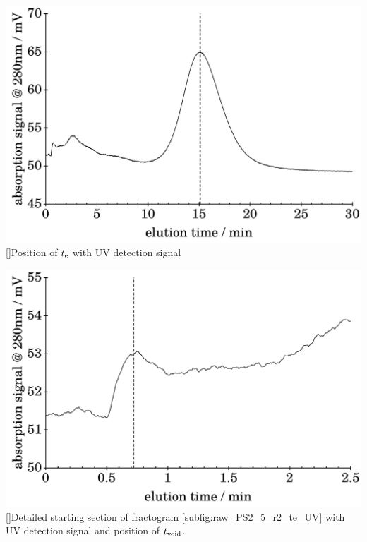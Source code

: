 \setcounter{subfigure}{0}
\begin{minipage}{\linewidth}
  \begin{center}
    \begin{minipage}{\subFigSize}
      \includegraphics[width=\linewidth]{./images/data/rawPlots/img_PS_VC_05_rep2_te_UV.pdf}
      []{Position of $t_\text{e}$ with UV detection signal}
      \label{subfig:raw_PS2_5_r2_te_UV}
    \end{minipage}
    \begin{minipage}{\subFigSize}
      \includegraphics[width=\linewidth]{./images/data/rawPlots/img_PS_VC_05_rep2_t0_UV.pdf}
            []{Detailed starting section of fractogram \ref{subfig:raw_PS2_5_r2_te_UV}
        with UV detection signal and position of $t_\text{void}$.}

\end{minipage}
\end{center}
\end{minipage}
